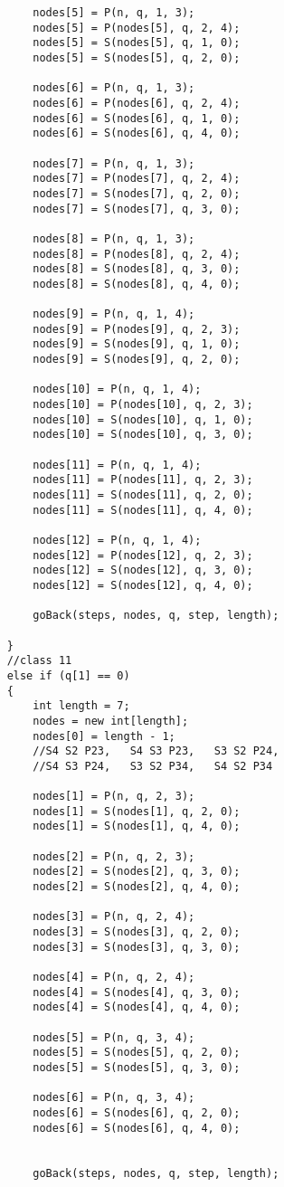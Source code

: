 \begin{lstlisting}
		nodes[5] = P(n, q, 1, 3);
		nodes[5] = P(nodes[5], q, 2, 4);
		nodes[5] = S(nodes[5], q, 1, 0);
		nodes[5] = S(nodes[5], q, 2, 0);

		nodes[6] = P(n, q, 1, 3);
		nodes[6] = P(nodes[6], q, 2, 4);
		nodes[6] = S(nodes[6], q, 1, 0);
		nodes[6] = S(nodes[6], q, 4, 0);

		nodes[7] = P(n, q, 1, 3);
		nodes[7] = P(nodes[7], q, 2, 4);
		nodes[7] = S(nodes[7], q, 2, 0);
		nodes[7] = S(nodes[7], q, 3, 0);

		nodes[8] = P(n, q, 1, 3);
		nodes[8] = P(nodes[8], q, 2, 4);
		nodes[8] = S(nodes[8], q, 3, 0);
		nodes[8] = S(nodes[8], q, 4, 0);

		nodes[9] = P(n, q, 1, 4);
		nodes[9] = P(nodes[9], q, 2, 3);
		nodes[9] = S(nodes[9], q, 1, 0);
		nodes[9] = S(nodes[9], q, 2, 0);
		
		nodes[10] = P(n, q, 1, 4);
		nodes[10] = P(nodes[10], q, 2, 3);
		nodes[10] = S(nodes[10], q, 1, 0);
		nodes[10] = S(nodes[10], q, 3, 0);

		nodes[11] = P(n, q, 1, 4);
		nodes[11] = P(nodes[11], q, 2, 3);
		nodes[11] = S(nodes[11], q, 2, 0);
		nodes[11] = S(nodes[11], q, 4, 0);

		nodes[12] = P(n, q, 1, 4);
		nodes[12] = P(nodes[12], q, 2, 3);
		nodes[12] = S(nodes[12], q, 3, 0);
		nodes[12] = S(nodes[12], q, 4, 0);

		goBack(steps, nodes, q, step, length);

	}
	//class 11
	else if (q[1] == 0)
	{
		int length = 7;
		nodes = new int[length];
		nodes[0] = length - 1;
		//S4 S2 P23,   S4 S3 P23,   S3 S2 P24,   
		//S4 S3 P24,   S3 S2 P34,   S4 S2 P34

		nodes[1] = P(n, q, 2, 3);
		nodes[1] = S(nodes[1], q, 2, 0);
		nodes[1] = S(nodes[1], q, 4, 0);

		nodes[2] = P(n, q, 2, 3);
		nodes[2] = S(nodes[2], q, 3, 0);
		nodes[2] = S(nodes[2], q, 4, 0);

		nodes[3] = P(n, q, 2, 4);
		nodes[3] = S(nodes[3], q, 2, 0);
		nodes[3] = S(nodes[3], q, 3, 0);

		nodes[4] = P(n, q, 2, 4);
		nodes[4] = S(nodes[4], q, 3, 0);
		nodes[4] = S(nodes[4], q, 4, 0);

		nodes[5] = P(n, q, 3, 4);
		nodes[5] = S(nodes[5], q, 2, 0);
		nodes[5] = S(nodes[5], q, 3, 0);

		nodes[6] = P(n, q, 3, 4);
		nodes[6] = S(nodes[6], q, 2, 0);
		nodes[6] = S(nodes[6], q, 4, 0);
		

		goBack(steps, nodes, q, step, length);


\end{lstlisting}
